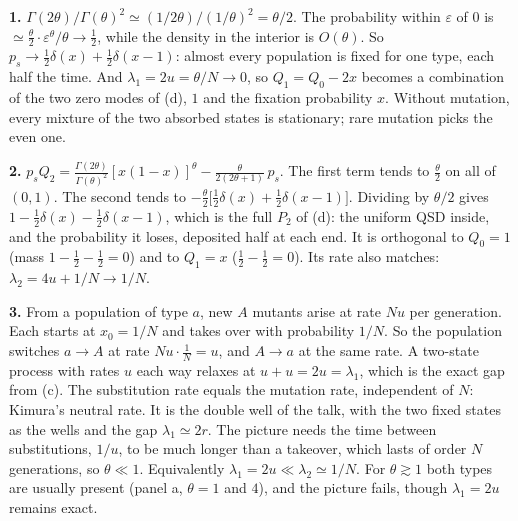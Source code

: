 \documentclass[11pt]{article}
\newcommand{\exsec}[1]{\par\vspace{6pt}{\sffamily\bfseries\large\color{PineGreen}#1}\par\vspace{-2pt}}
\begin{document}
\exsec{(e) Optional: from one to the other}
\textbf{1.} $\Gamma(2\theta)/\Gamma(\theta)^2\simeq(1/2\theta)/(1/\theta)^2=\theta/2$. The probability within
$\varepsilon$ of $0$ is $\simeq\frac\theta2\cdot\varepsilon^\theta/\theta\to\frac12$, while the density in the
interior is $O(\theta)$. So $p_s\to\frac12\delta(x)+\frac12\delta(x-1)$: almost every population is fixed for one
type, each half the time. And $\lambda_1=2u=\theta/N\to0$, so $Q_1=Q_0-2x$ becomes a combination of the two zero
modes of (d), $1$ and the fixation probability $x$. Without mutation, every mixture of the two absorbed states is
stationary; rare mutation picks the even one.

\textbf{2.} $p_sQ_2=\frac{\Gamma(2\theta)}{\Gamma(\theta)^2}[x(1-x)]^\theta-\frac\theta{2(2\theta+1)}\,p_s$. The first
term tends to $\frac\theta2$ on all of $(0,1)$. The second tends to $-\frac\theta2\bigl[\frac12\delta(x)+\frac12
\delta(x-1)\bigr]$. Dividing by $\theta/2$ gives $1-\frac12\delta(x)-\frac12\delta(x-1)$, which is the full $P_2$ of
(d): the uniform QSD inside, and the probability it loses, deposited half at each end. It is orthogonal to
$Q_0=1$ (mass $1-\frac12-\frac12=0$) and to $Q_1=x$ ($\frac12-\frac12=0$). Its rate also matches:
$\lambda_2=4u+1/N\to1/N$.

\textbf{3.} From a population of type $a$, new $A$ mutants arise at rate $Nu$ per generation. Each starts at
$x_0=1/N$ and takes over with probability $1/N$. So the population switches $a\to A$ at rate $Nu\cdot\frac1N=u$, and
$A\to a$ at the same rate. A two-state process with rates $u$ each way relaxes at $u+u=2u=\lambda_1$, which is the
exact gap from (c). The substitution rate equals the mutation rate, independent of $N$: Kimura's neutral rate. It
is the double well of the talk, with the two fixed states as the wells and the gap $\lambda_1\simeq2r$. The picture
needs the time between substitutions, $1/u$, to be much longer than a takeover, which lasts of order $N$
generations, so $\theta\ll1$. Equivalently $\lambda_1=2u\ll\lambda_2\simeq1/N$. For $\theta\gtrsim1$ both types are
usually present (panel a, $\theta=1$ and $4$), and the picture fails, though $\lambda_1=2u$ remains exact.
\end{document}
